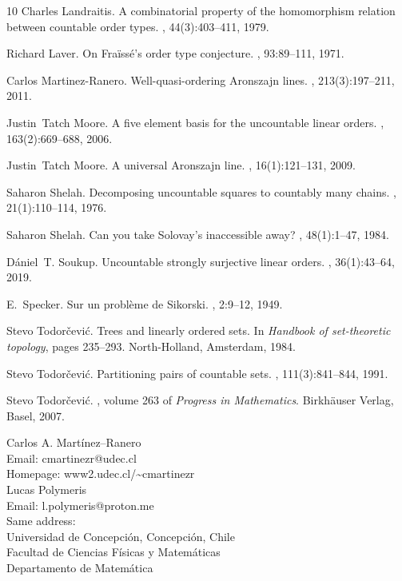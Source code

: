 \documentclass[10pt]{amsart}
\theoremstyle{definition}
\theoremstyle{remark}
\newcommand{\1}{\mathbbm{1}}
\begin{document}
\begin{thebibliography}{10}
Charles Landraitis.
\newblock A combinatorial property of the homomorphism relation between
  countable order types.
, 44(3):403--411, 1979.

Richard Laver.
\newblock On {F}ra\"iss\'e's order type conjecture.
, 93:89--111, 1971.

Carlos Martinez-Ranero.
\newblock Well-quasi-ordering {A}ronszajn lines.
, 213(3):197--211, 2011.

Justin~Tatch Moore.
\newblock A five element basis for the uncountable linear orders.
, 163(2):669--688, 2006.

Justin~Tatch Moore.
\newblock A universal {A}ronszajn line.
, 16(1):121--131, 2009.

Saharon Shelah.
\newblock Decomposing uncountable squares to countably many chains.
, 21(1):110--114, 1976.

Saharon Shelah.
\newblock Can you take {S}olovay's inaccessible away?
, 48(1):1--47, 1984.

D\'aniel~T. Soukup.
\newblock Uncountable strongly surjective linear orders.
, 36(1):43--64, 2019.

E.~Specker.
\newblock Sur un probl\`eme de {S}ikorski.
, 2:9--12, 1949.

Stevo Todor\v{c}evi\'c.
\newblock Trees and linearly ordered sets.
\newblock In {\em Handbook of set-theoretic topology}, pages 235--293.
  North-Holland, Amsterdam, 1984.

Stevo Todor\v{c}evi\'c.
\newblock Partitioning pairs of countable sets.
, 111(3):841--844, 1991.

Stevo Todor\v{c}evi\'c.
, volume 263 of {\em
  Progress in Mathematics}.
\newblock Birkh\"auser Verlag, Basel, 2007.

\end{thebibliography}

\bigskip
\noindent Carlos A. Mart\'inez--Ranero\\
Email: cmartinezr@udec.cl\\
Homepage: www2.udec.cl/\textasciitilde cmartinezr\\
\noindent Lucas Polymeris\\
Email: l.polymeris@proton.me \\

\noindent Same address: \\
Universidad de Concepci\'on, Concepci\'on, Chile\\
Facultad de Ciencias F\'isicas y Matem\'aticas\\
Departamento de Matem\'atica\\
\end{document}
